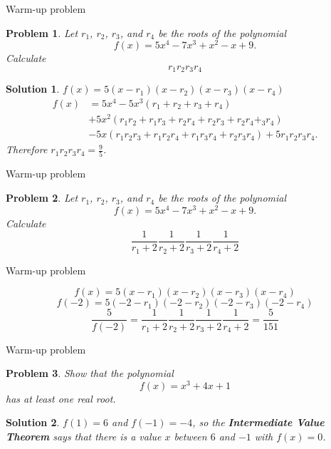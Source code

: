 \documentclass{beamer}
\newtheorem{prob}{Problem}
\newtheorem{soln}{Solution}
\begin{document}
\begin{frame}{Warm-up problem}
\begin{prob}
Let $r_1$, $r_2$, $r_3$, and $r_4$ be the roots of the polynomial
$$f(x) = 5x^4 - 7x^3 + x^2 -x + 9.$$
Calculate
$$r_1r_2r_3r_4$$
\end{prob}
\pause
\begin{soln}
\pause
$f(x) = 5(x-r_1)(x-r_2)(x-r_3)(x-r_4)$
\pause
{\small
\begin{align*}
f(x)
  & = 5x^4 - 5x^3(r_1+r_2+r_3+r_4)\\
  & + 5x^2(r_1r_2+r_1r_3+r_2r_4+r_2r_3+r_2r_4+_3r_4)\\
  & - 5x(r_1r_2r_3+r_1r_2r_4+r_1r_3r_4+r_2r_3r_4) + 5r_1r_2r_3r_4.
\end{align*}
}
\pause
Therefore $r_1r_2r_3r_4 = \frac{9}{5}$.
\end{soln}
\end{frame}

\begin{frame}{Warm-up problem}
\begin{prob}
Let $r_1$, $r_2$, $r_3$, and $r_4$ be the roots of the polynomial
$$f(x) = 5x^4 - 7x^3 + x^2 -x + 9.$$
Calculate
$$\frac{1}{r_1+2}\frac{1}{r_2+2}\frac{1}{r_3+2}\frac{1}{r_4+2}$$
\end{prob}
\end{frame}

\begin{frame}{Warm-up problem}
\begin{solution}
\pause
$$f(x)  = 5(x-r_1)(x-r_2)(x-r_3)(x-r_4)$$
\pause
$$f(-2)  = 5(-2-r_1)(-2-r_2)(-2-r_3)(-2-r_4)$$
\pause
$$\frac{5}{f(-2)}  = \frac{1}{r_1+2}\frac{1}{r_2+2}\frac{1}{r_3+2}\frac{1}{r_4+2} = \frac{5}{151}$$
\end{solution}
\end{frame}

\begin{frame}{Warm-up problem}
\begin{prob}
Show that the polynomial
$$f(x) = x^3 + 4x + 1$$
has at least one real root.
\end{prob}
\pause
\begin{soln}
$f(1) = 6$ and $f(-1) = -4$, so the \textbf{Intermediate Value Theorem} says that there is a value $x$ between $6$ and $-1$ with $f(x) = 0$.
\end{soln}
\end{frame}
\end{document}
